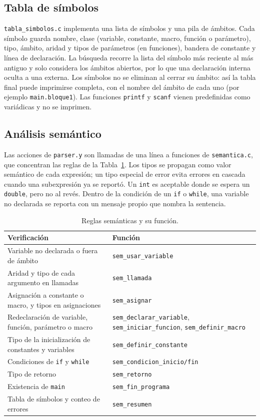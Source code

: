 \documentclass[runningheads]{llncs}
\begin{document}
\subsection{Tabla de símbolos}
\texttt{tabla\_simbolos.c} implementa una lista de símbolos y una pila de ámbitos. Cada símbolo guarda nombre, clase (variable, constante, macro, función o parámetro), tipo, ámbito, aridad y tipos de parámetros (en funciones), bandera de constante y línea de declaración. La búsqueda recorre la lista del símbolo más reciente al más antiguo y solo considera los ámbitos abiertos, por lo que una declaración interna oculta a una externa. Los símbolos no se eliminan al cerrar su ámbito: así la tabla final puede imprimirse completa, con el nombre del ámbito de cada uno (por ejemplo \texttt{main.bloque1}). Las funciones \texttt{printf} y \texttt{scanf} vienen predefinidas como variádicas y no se imprimen.

\subsection{Análisis semántico}
Las acciones de \texttt{parser.y} son llamadas de una línea a funciones de \texttt{semantica.c}, que concentran las reglas de la Tabla~\ref{tab:reglas}. Los tipos se propagan como valor semántico de cada expresión; un tipo especial de error evita errores en cascada cuando una subexpresión ya se reportó. Un \texttt{int} es aceptable donde se espera un \texttt{double}, pero no al revés. Dentro de la condición de un \texttt{if} o \texttt{while}, una variable no declarada se reporta con un mensaje propio que nombra la sentencia.

\begin{table}[t]
\caption{Reglas semánticas y su función.}\label{tab:reglas}
\centering\footnotesize
\begin{tabular}{@{}p{58mm}p{50mm}@{}}
\toprule
Verificación & Función\\
\midrule
Variable no declarada o fuera de ámbito & \texttt{sem\_usar\_variable}\\
Aridad y tipo de cada argumento en llamadas & \texttt{sem\_llamada}\\
Asignación a constante o macro, y tipos en asignaciones & \texttt{sem\_asignar}\\
Redeclaración de variable, función, parámetro o macro & \texttt{sem\_declarar\_variable}, \texttt{sem\_iniciar\_funcion}, \texttt{sem\_definir\_macro}\\
Tipo de la inicialización de constantes y variables & \texttt{sem\_definir\_constante}\\
Condiciones de \texttt{if} y \texttt{while} & \texttt{sem\_condicion\_inicio/fin}\\
Tipo de retorno & \texttt{sem\_retorno}\\
Existencia de \texttt{main} & \texttt{sem\_fin\_programa}\\
Tabla de símbolos y conteo de errores & \texttt{sem\_resumen}\\
\bottomrule
\end{tabular}
\end{table}
\end{document}

